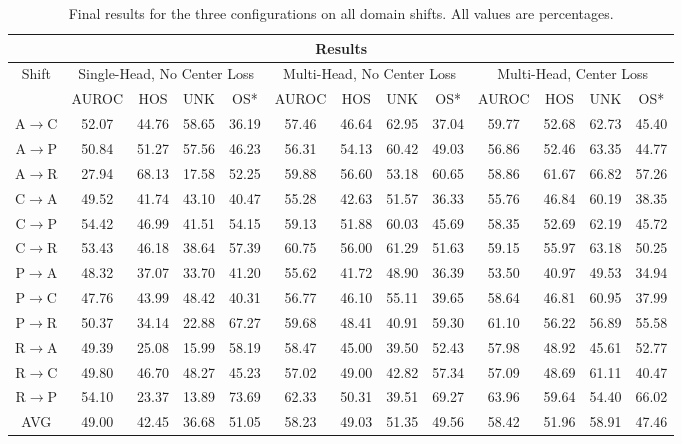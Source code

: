 \documentclass[10pt,twocolumn,letterpaper]{article}
\begin{document}
\begin{table}
  \centering
  \begin{tabular}[t]{||c||c|c|c|c||c|c|c|c||c|c|c|c||}
    \hline
    \multicolumn{13}{||c||}{Results} \\
    \hline
    \multirow{2}{*}{Shift}   & \multicolumn{4}{|c||}{Single-Head, No Center Loss} & \multicolumn{4}{|c||}{Multi-Head, No Center Loss} & \multicolumn{4}{|c||}{Multi-Head, Center Loss} \\
            & AUROC & HOS   & UNK   & OS*   & AUROC & HOS   & UNK   & OS*   & AUROC & HOS   & UNK   & OS*   \\
    \hline
    A$\to$C & 52.07 & 44.76 & 58.65 & 36.19 & 57.46 & 46.64 & 62.95 & 37.04 & 59.77 & 52.68 & 62.73 & 45.40 \\
    A$\to$P & 50.84 & 51.27 & 57.56 & 46.23 & 56.31 & 54.13 & 60.42 & 49.03 & 56.86 & 52.46 & 63.35 & 44.77 \\
    A$\to$R & 27.94 & 68.13 & 17.58 & 52.25 & 59.88 & 56.60 & 53.18 & 60.65 & 58.86 & 61.67 & 66.82 & 57.26 \\
    C$\to$A & 49.52 & 41.74 & 43.10 & 40.47 & 55.28 & 42.63 & 51.57 & 36.33 & 55.76 & 46.84 & 60.19 & 38.35 \\
    C$\to$P & 54.42 & 46.99 & 41.51 & 54.15 & 59.13 & 51.88 & 60.03 & 45.69 & 58.35 & 52.69 & 62.19 & 45.72 \\
    C$\to$R & 53.43 & 46.18 & 38.64 & 57.39 & 60.75 & 56.00 & 61.29 & 51.63 & 59.15 & 55.97 & 63.18 & 50.25 \\
    P$\to$A & 48.32 & 37.07 & 33.70 & 41.20 & 55.62 & 41.72 & 48.90 & 36.39 & 53.50 & 40.97 & 49.53 & 34.94 \\
    P$\to$C & 47.76 & 43.99 & 48.42 & 40.31 & 56.77 & 46.10 & 55.11 & 39.65 & 58.64 & 46.81 & 60.95 & 37.99 \\
    P$\to$R & 50.37 & 34.14 & 22.88 & 67.27 & 59.68 & 48.41 & 40.91 & 59.30 & 61.10 & 56.22 & 56.89 & 55.58 \\
    R$\to$A & 49.39 & 25.08 & 15.99 & 58.19 & 58.47 & 45.00 & 39.50 & 52.43 & 57.98 & 48.92 & 45.61 & 52.77 \\
    R$\to$C & 49.80 & 46.70 & 48.27 & 45.23 & 57.02 & 49.00 & 42.82 & 57.34 & 57.09 & 48.69 & 61.11 & 40.47 \\
    R$\to$P & 54.10 & 23.37 & 13.89 & 73.69 & 62.33 & 50.31 & 39.51 & 69.27 & 63.96 & 59.64 & 54.40 & 66.02 \\
    \hline
    AVG     & 49.00 & 42.45 & 36.68 & 51.05 & 58.23 & 49.03 & 51.35 & 49.56 & 58.42 & 51.96 & 58.91 & 47.46 \\ 
    \hline
  \end{tabular}
  \caption{\centering\label{tab:results}Final results for the three configurations on all domain shifts. All values are percentages.}
\end{table}
\end{document}
